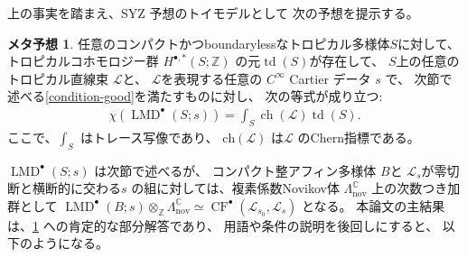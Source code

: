 \documentclass[uplatex,dvipdfmx,12pt]{jsarticle}
\numberwithin{equation}{section}
\theoremstyle{definition}
\newtheorem{expectation}[theorem]{メタ予想}
\newcommand{\opn}[1]{\operatorname{#1}}
\begin{document}

上の事実を踏まえ、SYZ 予想のトイモデルとして
次の予想を提示する。

\begin{expectation} \label{conjecture-mirror-tropical-rr}
任意のコンパクトかつboundarylessなトロピカル多様体$S$に対して、
トロピカルコホモロジー群 $H^{\bullet,*}(S;\mathbb{Z})$
の元$\opn{td}(S)$が存在して、
$S$上の任意の
トロピカル直線束
$\mathcal{L}$と、
$\mathcal{L}$を表現する任意の
$C^{\infty}$ Cartier データ $s$ で、
次節で述べる\cref{condition-good}を満たすものに対し、
次の等式が成り立つ:
\begin{align}
\chi(\opn{LMD}^{\bullet}(S;s))=
\int_{S}\opn{ch}(\mathcal{L})\opn{td}(S).
\end{align}
ここで、$\int_S$ はトレース写像であり、
$\mathrm{ch}(\mathcal{L})$ は$\mathcal{L}$ のChern指標である。
\end{expectation}

$\opn{LMD}^{\bullet}(S;s)$ は次節で述べるが、
コンパクト整アフィン多様体 $B$と
$\mathscr{L}_s$が零切断と横断的に交わる$s$
の組に対しては、複素係数Novikov体 
$\Lambda^{\mathbb{C}}_{\mathrm{nov}}$
上の次数つき加群として
$\opn{LMD}^{\bullet}(B;s)\otimes_{\mathbb{Z}}
\Lambda^{\mathbb{C}}_{\mathrm{nov}}\simeq
\opn{CF}^{\bullet}(\mathscr{L}_{s_0},
\mathscr{L}_s)$ となる。
本論文の主結果は、\cref{conjecture-mirror-tropical-rr}
への肯定的な部分解答であり、
用語や条件の説明を後回しにすると、
以下のようになる。
\end{document}
